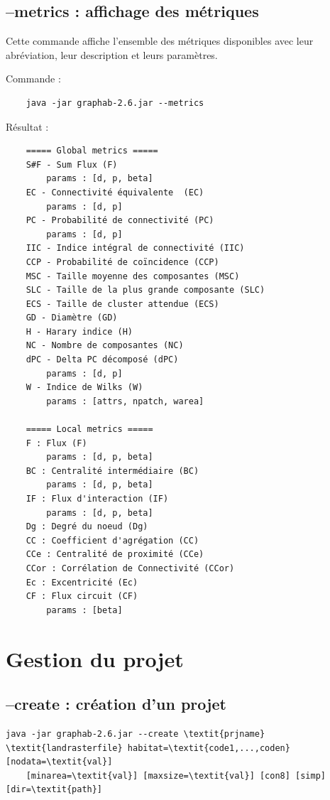 \documentclass[a4paper,10pt]{report}
\begin{document}
\subsection{--metrics : affichage des métriques}
Cette commande affiche l'ensemble des métriques disponibles avec leur abréviation, leur description et leurs paramètres.

Commande :
\begin{Verbatim}
	java -jar graphab-2.6.jar --metrics
\end{Verbatim}
Résultat :
\begin{Verbatim}
	===== Global metrics =====
	S#F - Sum Flux (F)
		params : [d, p, beta]
	EC - Connectivité équivalente  (EC)
		params : [d, p]
	PC - Probabilité de connectivité (PC)
		params : [d, p]
	IIC - Indice intégral de connectivité (IIC)
	CCP - Probabilité de coïncidence (CCP)
	MSC - Taille moyenne des composantes (MSC)
	SLC - Taille de la plus grande composante (SLC)
	ECS - Taille de cluster attendue (ECS)
	GD - Diamètre (GD)
	H - Harary indice (H)
	NC - Nombre de composantes (NC)
	dPC - Delta PC décomposé (dPC)
		params : [d, p]
	W - Indice de Wilks (W)
		params : [attrs, npatch, warea]
	
	===== Local metrics =====
	F : Flux (F)
		params : [d, p, beta]
	BC : Centralité intermédiaire (BC)
		params : [d, p, beta]
	IF : Flux d'interaction (IF)
		params : [d, p, beta]
	Dg : Degré du noeud (Dg)
	CC : Coefficient d'agrégation (CC)
	CCe : Centralité de proximité (CCe)
	CCor : Corrélation de Connectivité (CCor)
	Ec : Excentricité (Ec)
	CF : Flux circuit (CF)
		params : [beta]

\end{Verbatim}

\section{Gestion du projet}

\subsection{--create : création d'un projet}

\begin{Verbatim}[commandchars=\\\{\}]
java -jar graphab-2.6.jar --create \textit{prjname} \textit{landrasterfile} habitat=\textit{code1,...,coden} [nodata=\textit{val}] 
	[minarea=\textit{val}] [maxsize=\textit{val}] [con8] [simp] [dir=\textit{path}]
\end{Verbatim}
\end{document}
